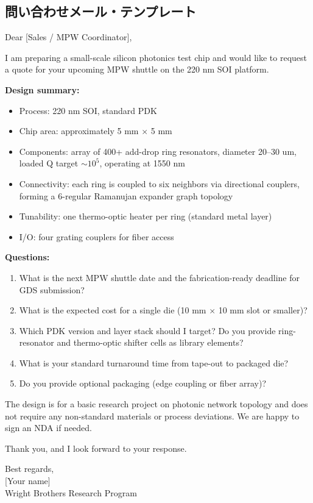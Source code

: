 \documentclass[11pt,a4paper]{article}
\begin{document}
\subsection{問い合わせメール・テンプレート}
\label{sec:foundry_email}

\begin{tcolorbox}[colback=gray!5,colframe=gray!60!black,
  title=Subject: Quote request - Si photonic ring resonator array (expander graph)]
\small
Dear [Sales / MPW Coordinator],

I am preparing a small-scale silicon photonics test chip and would like
to request a quote for your upcoming MPW shuttle on the 220 nm SOI
platform.

\textbf{Design summary:}
\begin{itemize}[nosep]
\item Process: 220 nm SOI, standard PDK
\item Chip area: approximately 5 mm $\times$ 5 mm
\item Components: array of 400+ add-drop ring resonators,
      diameter 20--30 um, loaded Q target $\sim 10^5$, operating at 1550 nm
\item Connectivity: each ring is coupled to six neighbors via directional
      couplers, forming a 6-regular Ramanujan expander graph topology
\item Tunability: one thermo-optic heater per ring (standard metal layer)
\item I/O: four grating couplers for fiber access
\end{itemize}

\textbf{Questions:}
\begin{enumerate}[nosep]
\item What is the next MPW shuttle date and the fabrication-ready deadline
      for GDS submission?
\item What is the expected cost for a single die (10 mm $\times$ 10 mm
      slot or smaller)?
\item Which PDK version and layer stack should I target? Do you provide
      ring-resonator and thermo-optic shifter cells as library elements?
\item What is your standard turnaround time from tape-out to packaged die?
\item Do you provide optional packaging (edge coupling or fiber array)?
\end{enumerate}

The design is for a basic research project on photonic network topology
and does not require any non-standard materials or process deviations.
We are happy to sign an NDA if needed.

Thank you, and I look forward to your response.

Best regards,\\
{[}Your name{]}\\
Wright Brothers Research Program
\end{tcolorbox}
\end{document}
